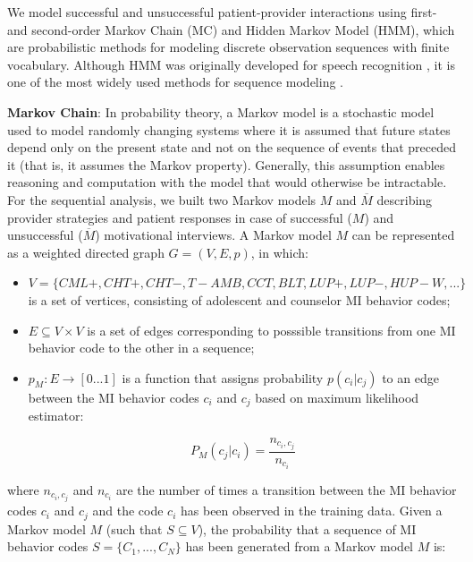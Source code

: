 \documentclass{amia}
\begin{document}
We model successful and unsuccessful patient-provider interactions using first- and second-order Markov Chain (MC) and Hidden Markov Model (HMM), which are probabilistic methods for modeling discrete observation sequences with finite vocabulary. Although HMM was originally developed for speech recognition \cite{rabiner1989tutorial}, it is one of the most widely used methods for sequence modeling \cite{mutsam2016maximum, eickeler1998hidden, srivastava2007hmm, won2004training, chai2001folk}.

\textbf {Markov Chain}: In probability theory, a Markov model \cite{} is a stochastic model used to model randomly changing systems where it is assumed that future states depend only on the present state and not on the sequence of events that preceded it (that is, it assumes the Markov property). Generally, this assumption enables reasoning and computation with the model that would otherwise be intractable. For the sequential analysis, we built two Markov models $M$ and $\overline{M}$ describing provider strategies and patient responses in case of successful ($M$) and unsuccessful ($\overline{M}$) motivational interviews. A Markov model $M$ can be represented as a weighted directed graph $G = (V, E, p)$, in which:

\begin{itemize}
\item $V = \{CML+, CHT+, CHT-, T-AMB, CCT, BLT, LUP+, LUP-, HUP-W, ...\}$ is a set of vertices, consisting of adolescent and counselor MI behavior codes;
\item $E \subseteq V \times V$ is a set of edges corresponding to posssible transitions from one MI behavior code to the other in a sequence;
\item $p_M:E\rightarrow[0...1]$ is a function that assigns probability $p(c_i|c_j)$ to an edge between the MI behavior codes $c_i$ and $c_j$ based on maximum likelihood estimator:

\begin{equation}
P_M(c_j|c_i) = \frac{n_{c_i,c_j}}{n_{c_i}}
\end{equation}

\end{itemize}

where $n_{c_i,c_j}$ and $n_{c_i}$ are the number of times a transition between the MI behavior codes $c_i$ and $c_j$ and the code $c_i$ has been observed in the training data. Given a Markov model $M$ (such that $S\subseteq V$), the probability that a sequence of MI behavior codes $S = \{C_1,...,C_N\}$ has been generated from a Markov model $M$ is:
\end{document}
